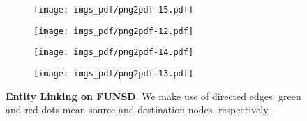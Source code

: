 \documentclass[runningheads]{llncs}
\begin{document}
\begin{table}[ht!]
    \centering
    \caption{\textbf{Table Detection in terms of F1 score}. A table is considered correctly detected if its IoU is greater than 0.50. Threshold values refers to the scores an edges has to have in order to do not be cut: in our case is set to 0.50 by the softmax in use.}
    \label{tab:edge_classification_f1}
\end{table}

\begin{figure}[t!]
    \centering
    \begin{subfigure}[b]{0.45\textwidth}
        \centering
        \texttt{[image: imgs\_pdf/png2pdf-15.pdf]}
        \caption{}
        \label{fig:case_a}
    \end{subfigure}
    \begin{subfigure}[b]{0.45\textwidth}
        \centering
        \texttt{[image: imgs\_pdf/png2pdf-12.pdf]}
        \caption{}
        \label{fig:case_b}
    \end{subfigure}
    \begin{subfigure}[b]{0.45\textwidth}
        \centering
        \texttt{[image: imgs\_pdf/png2pdf-14.pdf]}
        \caption{}
        \label{fig:case_c}
    \end{subfigure}
    \begin{subfigure}[b]{0.45\textwidth}
        \centering
        \texttt{[image: imgs\_pdf/png2pdf-13.pdf]}
        \caption{}
        \label{fig:case_d}
    \end{subfigure}
    \caption{\textbf{Entity Linking on FUNSD}. We make use of directed edges: green and red dots mean source and destination nodes, respectively.}
    \label{fig:link-prediction}
\end{figure}
\end{document}
